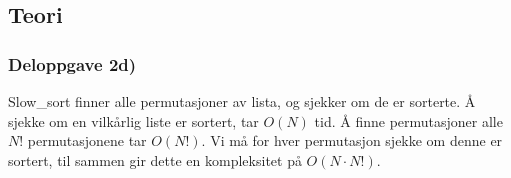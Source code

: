 \documentclass[norsk,a4paper]{article}
\begin{document}
\subsection{Teori}
\subsubsection{Deloppgave 2d)}
Slow\_sort finner alle permutasjoner av lista, og sjekker om de er sorterte. Å
sjekke om en vilkårlig liste er sortert, tar \(O(N)\) tid. Å finne
permutasjoner alle \(N!\) permutasjonene tar \(O(N!)\). Vi må for hver
permutasjon sjekke om denne er sortert, til sammen gir dette en kompleksitet på
\(O(N\cdot N!)\).
\end{document}
